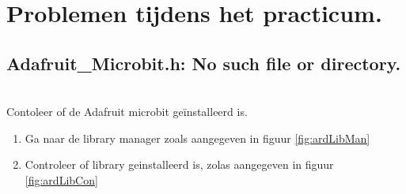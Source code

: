 
\chapter{Problemen tijdens het practicum.}


\section{Adafruit\_Microbit.h: No such file or directory.}~\\
Contoleer of de Adafruit microbit geïnstalleerd is.
\begin{enumerate}
	\item Ga naar de library manager zoals aangegeven in figuur \ref{fig:ardLibMan}
	\item Controleer of library geinstalleerd is, zolas aangegeven in figuur \ref{fig:ardLibCon}
\end{enumerate}

